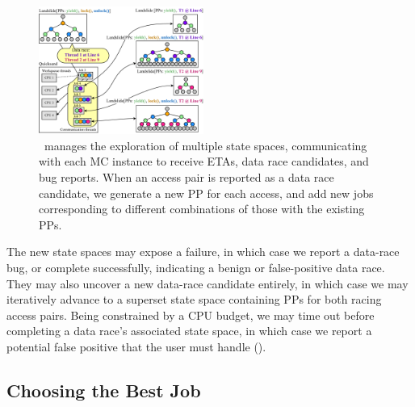\begin{figure}[t]
	\includegraphics[width=0.48\textwidth]{dr-jobs-v2.pdf}
	\caption{\quicksand~manages the exploration of multiple state spaces, communicating with each MC instance to receive ETAs, data race candidates, and bug reports.
		When an access pair is reported as a data race candidate, we generate a new PP for each access, and add new jobs corresponding to different combinations of those with the existing PPs.}
	\label{fig:new-dr-jobs}
\end{figure}

The new state spaces may expose a failure, in which case we report a data-race bug,
or complete successfully, indicating a benign or false-positive data race.
They may also uncover a new data-race candidate entirely, %
in which case we may iteratively advance to a superset state space containing PPs for both racing access pairs.
Being constrained by a CPU budget,
we may time out before completing a data race's associated state space,
in which case we report a potential false positive that the user must handle (\sect{\ref{sec:future}}).


\subsection{Choosing the Best Job}

